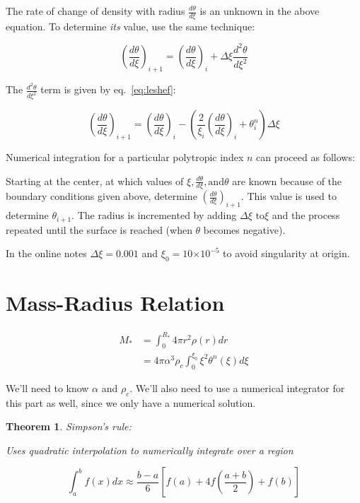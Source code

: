 \documentclass{article}
\providecommand{\e}[1]{\ensuremath{\times 10^{#1}}}
\newtheorem{thm}{Theorem}
\begin{document}
    The rate of change of density with radius \(\frac{d\theta}{d\xi}\) is an
    unknown in the above equation. To determine \emph{its} value, use the same
    technique:

    \begin{equation}
        \left(\frac{d\theta}{d\xi}\right)_{i+1}=\left(\frac{d\theta}{d\xi}\right)_{i} +
        \Delta\xi\frac{d^2\theta}{d\xi^2}
    \end{equation}
    
    The \(\frac{d^2\theta}{d\xi^2}\) term is given by eq.~\ref{eq:leshef}:

    \begin{equation}
        \left(\frac{d\theta}{d\xi}\right)_{i+1} =
        \left(\frac{d\theta}{d\xi}\right)_i-\left(\frac{2}{\xi_i}\left(\frac{d\theta}{d\xi}\right)_i+\theta_i^n\right)\Delta\xi
    \end{equation}

    Numerical integration for a particular polytropic index \(n\) can proceed as
    follows:

    Starting at the center, at which values of \(\xi,\frac{d\theta}{d\xi},\text{
    and}\theta\) are known because of the boundary conditions given above,
    determine \(\left(\frac{d\theta}{d\xi}\right)_{i+1}\). This value is used to determine
    \(\theta_{i+1}\). The radius is incremented by adding \(\Delta\xi\text{ to}
    \xi\) and the process repeated until the surface is reached (when \(\theta\)
    becomes negative).

    In the online notes
    \(\Delta\xi=0.001\) and \(\xi_0=10\e{-5}\) to avoid singularity
    at origin.

    \section{Mass-Radius Relation}

        \begin{align*}
            M_*&=\int_0^{R_*}{4\pi r^2 \rho(r)}dr \\
               &=4\pi\alpha^3\rho_c\int_0^{\xi_0}{\xi^2\theta^n(\xi)}d\xi
        \end{align*}

        We'll need to  know \(\alpha\) and \(\rho_c\). We'll also need to use a
        numerical integrator for this part as well, since we only have a
        numerical solution.

        \begin{thm}
            Simpson's rule:

            Uses quadratic interpolation to numerically integrate over a region

            \[\int_a^b{f(x)}dx\approx\frac{b-a}{6}\left[f(a)+4f\left(\frac{a+b}{2}\right)+f(b)\right]\]
        \end{thm}
\end{document}
